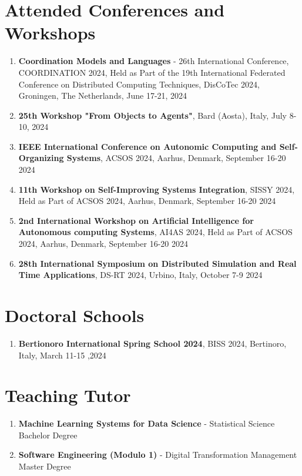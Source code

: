 \documentclass[runningheads]{llncs}
\begin{document}
\section{Attended Conferences and Workshops}
\begin{enumerate}
    \item \textbf{Coordination Models and Languages} - 26th International Conference, COORDINATION 2024, Held as Part of the 19th International Federated Conference on Distributed Computing Techniques, DisCoTec 2024, Groningen, The Netherlands, June 17-21, 2024
    \item \textbf{25th Workshop "From Objects to Agents"}, Bard (Aosta), Italy, July 8-10, 2024
    \item \textbf{IEEE International Conference on Autonomic Computing and Self-Organizing Systems}, ACSOS 2024, Aarhus, Denmark, September 16-20 2024
    \item \textbf{11th Workshop on Self-Improving Systems Integration}, SISSY 2024, Held as Part of ACSOS 2024, Aarhus, Denmark, September 16-20 2024
    \item \textbf{2nd International Workshop on Artificial Intelligence for Autonomous computing Systems}, AI4AS 2024, Held as Part of ACSOS 2024, Aarhus, Denmark, September 16-20 2024
    \item \textbf{28th International Symposium on Distributed Simulation and Real Time Applications}, DS-RT 2024, Urbino, Italy, October 7-9 2024
\end{enumerate}

\section{Doctoral Schools}
\begin{enumerate}
    \item \textbf{Bertionoro International Spring School 2024}, BISS 2024, Bertinoro, Italy, March 11-15 ,2024
\end{enumerate}

\section{Teaching Tutor}
\begin{enumerate}
    \item \textbf{Machine Learning Systems for Data Science} - Statistical Science Bachelor Degree
    \item \textbf{Software Engineering (Modulo 1)} - Digital Transformation Management Master Degree
\end{enumerate}
\end{document}
